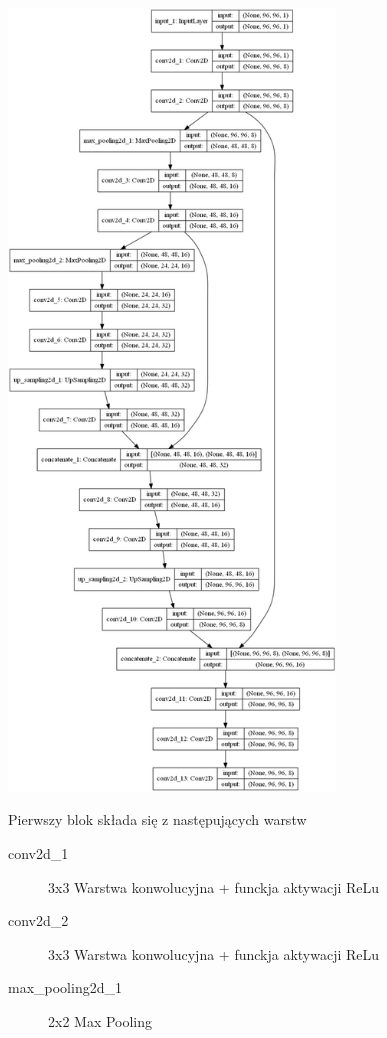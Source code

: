 \documentclass[a4paper,11pt,twoside]{report}
\theoremstyle{definition}
\begin{document}
\begin{minipage}{\linewidth}
	\centering
	\includegraphics[width=0.65\textwidth]{segmentation/our_architecture.png}
\end{minipage}

Pierwszy blok składa się z następujących warstw

\begin{description}
	\item [conv2d\_1] 3x3 Warstwa konwolucyjna + funckja aktywacji ReLu
	\item [conv2d\_2] 3x3 Warstwa konwolucyjna + funckja aktywacji ReLu
	\item [max\_pooling2d\_1]2x2 Max Pooling
\end{description}
\end{document}

